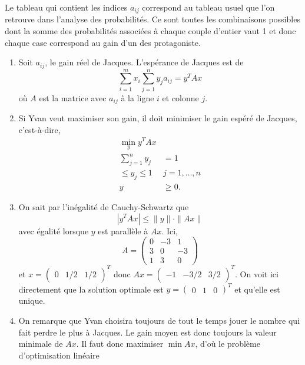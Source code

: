 \begin{enumerate}
\begin{solution}
      Le tableau qui contient les indices $a_{ij}$ correspond au tableau
      usuel que l'on retrouve dans l'analyse des probabilités.
      Ce sont toutes les combinaisons possibles dont la somme des probabilités
      associées à chaque couple d'entier vaut 1
      et donc chaque case correspond au gain d'un des protagoniste.
      \begin{enumerate}
        \item Soit $a_{ij}$, le gain réel de Jacques.
          L'espérance de Jacques est de
          $$\sum_{i=1}^{m}x_{i}\sum_{j=1}^{n}y_{j}a_{ij} = y^TAx$$
          où $A$ est la matrice avec $a_{ij}$ à la ligne $i$ et colonne $j$.
        \item Si Yvan veut maximiser son gain,
          il doit minimiser le gain espéré de Jacques, c'est-à-dire,
          \begin{align*}
            \min_y y^TAx\\
            \sum_{j=1}^n y_j & = 1\\
            \leq y_j \leq 1 & j = 1, \dots, n\\
            y & \geq 0.
          \end{align*}
        \item
          On sait par l'inégalité de Cauchy-Schwartz que
          \[ |y^TAx| \leq \|y\|\cdot\|Ax\| \]
          avec égalité lorsque $y$ est parallèle à $Ax$.
          Ici,
          \[ A =
            \begin{pmatrix}
              0 & -3 & 1\\
              3 & 0 & -3\\
              1 & 3 & 0
          \end{pmatrix} \]
          et $x = \begin{pmatrix}0 & 1/2 & 1/2\end{pmatrix}^T$
          donc $Ax = \begin{pmatrix}-1 & -3/2 & 3/2\end{pmatrix}^T$.
          On voit ici directement que la solution optimale est
          $y = \begin{pmatrix}0 & 1 & 0\end{pmatrix}^T$ et qu'elle est
          unique.
        \item On remarque que Yvan choisira toujours de tout le temps jouer
          le nombre qui fait perdre le plus à Jacques.
          Le gain moyen est donc toujours la valeur minimale de $Ax$.
          Il faut donc maximiser $\min Ax$, d'où le problème
          d'optimisation linéaire

\end{enumerate}
\end{solution}
\end{enumerate}
